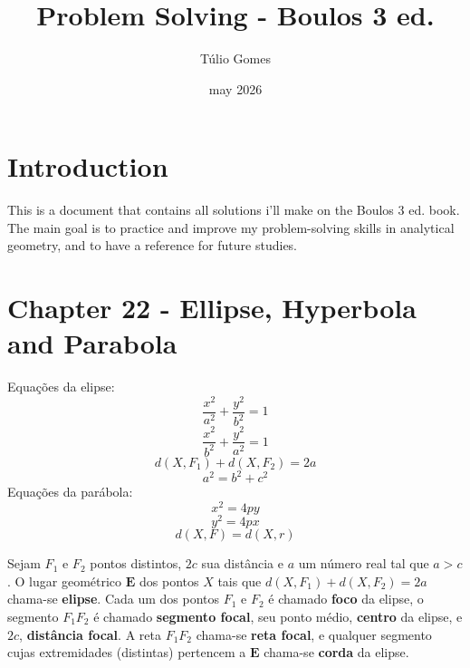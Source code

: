 \title{Problem Solving - Boulos 3 ed.}
\author{Túlio Gomes}
\date{may 2026}

\maketitle

\section{Introduction}
This is a document that contains all solutions i'll make on the Boulos 3 ed. book. The main goal is to practice and improve my problem-solving skills in analytical geometry, and to have a reference for future studies.

\section{Chapter 22 - Ellipse, Hyperbola and Parabola}
Equações da elipse:
\begin{equation}
    \frac{x^2}{a^2} + \frac{y^2}{b^2} = 1
\end{equation}
\begin{equation}
    \frac{x^2}{b^2} + \frac{y^2}{a^2} = 1
\end{equation}
\begin{equation}
    d(X, F_1) + d(X, F_2) = 2a
\end{equation}
\begin{equation}
    a^2=b^2+c^2
\end{equation}
Equações da parábola:
\begin{equation}
    x^2 = 4py
\end{equation}
\begin{equation}
    y^2 = 4px
\end{equation}
\begin{equation}
    d(X, F) = d(X, r)
\end{equation}


\noindent
\newcommand{\ellipseDefinition}{d(X,F_1) + d(X,F_2) = 2a}
\noindent
\begin{tcolorbox}[colback=gray!5, colframe=gray!60, arc=2mm, title=\textbf{22-1 \quad Defini\c{c}\~{a}o}, coltitle=white, fonttitle=\bfseries]
Sejam $F_1$ e $F_2$ pontos distintos, $2c$ sua dist\^{a}ncia e $a$ um n\'{u}mero real tal que $a > c$. O lugar geom\'{e}trico $\mathbf{E}$ dos pontos $X$ tais que $d(X,F_1) + d(X,F_2) = 2a$ chama-se \textbf{elipse}. Cada um dos pontos $F_1$ e $F_2$ \'{e} chamado \textbf{foco} da elipse, o segmento $F_1F_2$ \'{e} chamado \textbf{segmento focal}, seu ponto m\'{e}dio, \textbf{centro} da elipse, e $2c$, \textbf{dist\^{a}ncia focal}. A reta $F_1F_2$ chama-se \textbf{reta focal}, e qualquer segmento cujas extremidades (distintas) pertencem a $\mathbf{E}$ chama-se \textbf{corda} da elipse.
\end{tcolorbox}

